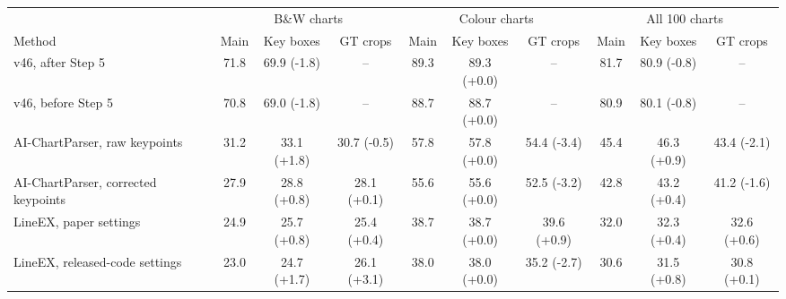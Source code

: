 \begin{tabular}{lccccccccc}
\toprule
 & \multicolumn{3}{c}{B\&W charts} & \multicolumn{3}{c}{Colour charts} & \multicolumn{3}{c}{All 100 charts} \\
Method & Main & Key boxes & GT crops & Main & Key boxes & GT crops & Main & Key boxes & GT crops \\
\midrule
v46, after Step 5 & 71.8 & 69.9 (-1.8) & -- & 89.3 & 89.3 (+0.0) & -- & 81.7 & 80.9 (-0.8) & -- \\
v46, before Step 5 & 70.8 & 69.0 (-1.8) & -- & 88.7 & 88.7 (+0.0) & -- & 80.9 & 80.1 (-0.8) & -- \\
AI-ChartParser, raw keypoints & 31.2 & 33.1 (+1.8) & 30.7 (-0.5) & 57.8 & 57.8 (+0.0) & 54.4 (-3.4) & 45.4 & 46.3 (+0.9) & 43.4 (-2.1) \\
AI-ChartParser, corrected keypoints & 27.9 & 28.8 (+0.8) & 28.1 (+0.1) & 55.6 & 55.6 (+0.0) & 52.5 (-3.2) & 42.8 & 43.2 (+0.4) & 41.2 (-1.6) \\
LineEX, paper settings & 24.9 & 25.7 (+0.8) & 25.4 (+0.4) & 38.7 & 38.7 (+0.0) & 39.6 (+0.9) & 32.0 & 32.3 (+0.4) & 32.6 (+0.6) \\
LineEX, released-code settings & 23.0 & 24.7 (+1.7) & 26.1 (+3.1) & 38.0 & 38.0 (+0.0) & 35.2 (-2.7) & 30.6 & 31.5 (+0.8) & 30.8 (+0.1) \\
\bottomrule
\end{tabular}
